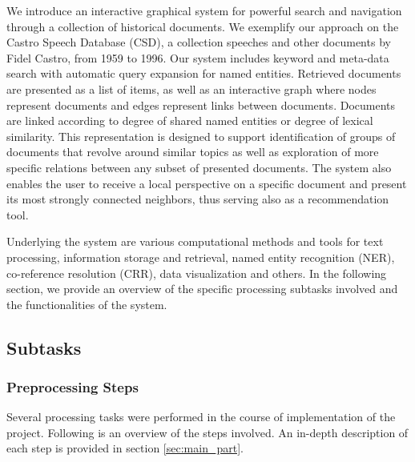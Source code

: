 We introduce an interactive graphical system for powerful search and navigation through a collection of historical documents. 
We exemplify our approach on the Castro Speech Database  (CSD), a collection 
speeches and other documents by Fidel Castro, from 1959 to 1996. Our system includes keyword and meta-data search with automatic query 
expansion for named entities. 
Retrieved documents are presented as a list of items, as well as an interactive graph where nodes represent 
documents and edges represent links between documents. Documents are linked according to degree of shared named entities or degree of lexical 
similarity. This representation is designed to support identification of groups of documents that revolve around similar topics as well as exploration of 
more specific relations between any subset of presented documents. The system also enables the user to receive a local perspective on a 
specific document and present its most strongly connected neighbors, thus serving also as a recommendation tool. 

Underlying the system are various computational methods and tools for text processing, 
information storage and retrieval, named entity recognition (NER), co-reference resolution (CRR), 
data visualization and others. In the following section, we provide an overview of the specific processing subtasks involved and the functionalities of the system.

\subsection{Subtasks}
\label{sec:subtasks}
\subsubsection{Preprocessing Steps}

Several processing tasks were performed in the course of implementation of the project. Following is an overview of the steps involved. An in-depth description of each step is provided in section \ref{sec:main_part}.

